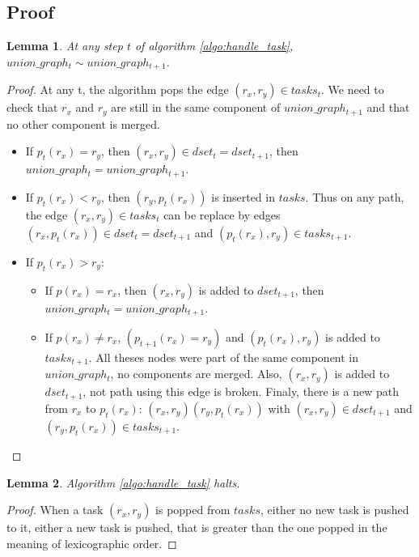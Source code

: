 \documentclass[12px]{article}
\newtheorem{lemma}{Lemma}
\begin{document}
  \subsection{Proof}
    \begin{lemma}
      At any step $t$ of algorithm \ref{algo:handle_task}, $union\_graph_t \sim union\_graph_{t+1}$.
    \end{lemma}
    \begin{proof}
      At any t, the algorithm pops the edge $(r_x, r_y) \in tasks_t$. We need to check that $r_x$ and $r_y$ are still in the same component of $union\_graph_{t+1}$ and that no other component is merged.
      \begin{itemize}
        \item If $p_t(r_x) = r_y$, then $(r_x, r_y) \in dset_t = dset_{t+1}$, then $union\_graph_t = union\_graph_{t+1}$.
        \item If $p_t(r_x) < r_y$, then $(r_y, p_t(r_x))$ is inserted in $tasks$. Thus on any path, the edge $(r_x, r_y) \in tasks_t$ can be replace by edges $(r_x, p_t(r_x)) \in dset_t = dset_{t+1}$ and $(p_t(r_x), r_y) \in tasks_{t+1}$.
        \item If $p_t(r_x) > r_y$:
        \begin{itemize}
          \item If $p(r_x) = r_x$, then $(r_x, r_y)$ is added to $dset_{t+1}$, then $union\_graph_t = union\_graph_{t+1}$.
          \item If $p(r_x) \neq r_x$, $(p_{t+1}(r_x) = r_y)$ and $(p_t(r_x), r_y)$ is added to $tasks_{t+1}$. All theses nodes were part of the same component in $union\_graph_t$, no components are merged. Also, $(r_x, r_y)$ is added to $dset_{t+1}$, not path using this edge is broken. Finaly, there is a new path from $r_x$ to $p_t(r_x)$: $(r_x, r_y)(r_y, p_t(r_x))$ with $(r_x, r_y) \in dset_{t+1}$ and $(r_y, p_t(r_x)) \in tasks_{t+1}$.
        \end{itemize}
      \end{itemize}
    \end{proof}

    \begin{lemma}
      Algorithm \ref{algo:handle_task} halts.
    \end{lemma}
    \begin{proof}
      When a task $(r_x, r_y)$ is popped from $tasks$, either no new task is pushed to it, either a new task is pushed, that is greater than the one popped in the meaning of lexicographic order.
    \end{proof}
\end{document}
